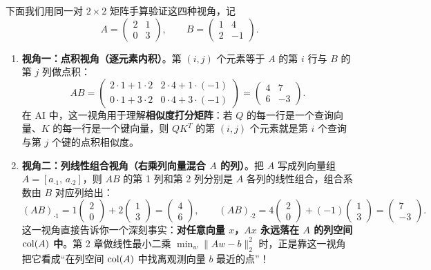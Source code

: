 下面我们用同一对 $2 \times 2$ 矩阵手算验证这四种视角，记
\[
A = \begin{pmatrix} 2 & 1 \\ 0 & 3 \end{pmatrix}, \qquad
B = \begin{pmatrix} 1 & 4 \\ 2 & -1 \end{pmatrix}.
\]

\begin{enumerate}
  \item \textbf{视角一：点积视角（逐元素内积）}。第 $(i,j)$ 个元素等于 $A$ 的第 $i$ 行与 $B$ 的第 $j$ 列做点积：
  \[
  AB = \begin{pmatrix}
    2\cdot 1 + 1\cdot 2 & 2\cdot 4 + 1\cdot(-1) \\
    0\cdot 1 + 3\cdot 2 & 0\cdot 4 + 3\cdot(-1)
  \end{pmatrix}
  = \begin{pmatrix} 4 & 7 \\ 6 & -3 \end{pmatrix}.
  \]
  在 AI 中，这一视角用于理解\textbf{相似度打分矩阵}：若 $Q$ 的每一行是一个查询向量、$K$ 的每一行是一个键向量，则 $QK^T$ 的第 $(i,j)$ 个元素就是第 $i$ 个查询与第 $j$ 个键的点积相似度。

  \item \textbf{视角二：列线性组合视角（右乘列向量混合 $A$ 的列）}。把 $A$ 写成列向量组 $A = [a_{\cdot 1},\, a_{\cdot 2}]$，则 $AB$ 的第 1 列和第 2 列分别是 $A$ 各列的线性组合，组合系数由 $B$ 对应列给出：
  \[
  (AB)_{\cdot 1} = 1\begin{pmatrix}2\\0\end{pmatrix} + 2\begin{pmatrix}1\\3\end{pmatrix} = \begin{pmatrix}4\\6\end{pmatrix}, \qquad
  (AB)_{\cdot 2} = 4\begin{pmatrix}2\\0\end{pmatrix} + (-1)\begin{pmatrix}1\\3\end{pmatrix} = \begin{pmatrix}7\\-3\end{pmatrix}.
  \]
  这一视角直接告诉你一个深刻事实：\textbf{对任意向量 $x$，$Ax$ 永远落在 $A$ 的列空间 $\operatorname{col}(A)$ 中}。第 2 章做线性最小二乘 $\min_w \|Aw - b\|_2^2$ 时，正是靠这一视角把它看成“在列空间 $\operatorname{col}(A)$ 中找离观测向量 $b$ 最近的点”！


\end{enumerate}

